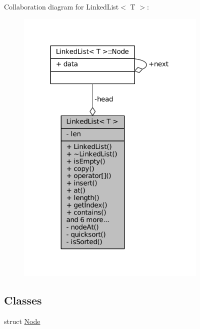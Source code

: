 Collaboration diagram for Linked\+List$<$ T $>$\+:
\nopagebreak
\begin{figure}[H]
\begin{center}
\leavevmode
\includegraphics[width=258pt]{classLinkedList__coll__graph}
\end{center}
\end{figure}
\subsection*{Classes}
\begin{DoxyCompactItemize}
\item 
struct \hyperlink{structLinkedList_1_1Node}{Node}
\end{DoxyCompactItemize}
